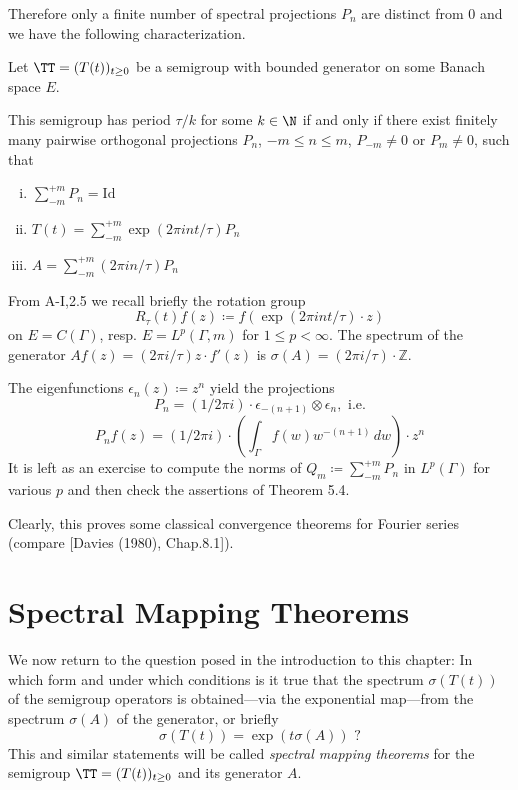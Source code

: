\newpage
Therefore only a finite number of spectral projections $P_{n}$ are distinct from $0$ and we have the following characterization.

\begin{corollary}\label{cor:a3-5.5}

Let $\TT = (T(t))_{t \geq 0}$ be a semigroup with bounded generator on some Banach space $E$.

This semigroup has period $\tau/k$ for some $k \in \N$ if and only if there exist finitely many pairwise orthogonal projections $P_{n}$, $-m \leq n \leq m$, $P_{-m} \neq 0$ or $P_{m} \neq 0$, such that
\begin{enumerate}[(i)]
\item $\sum_{-m}^{+m} P_{n} = \text{Id}$

\item $T(t) = \sum_{-m}^{+m} \exp(2\pi int/\tau)P_{n}$

\item $A = \sum_{-m}^{+m} (2\pi in/\tau)P_{n}$
\end{enumerate}
\end{corollary}

\begin{example}\label{ex:a3-5.6}

From A-I,2.5 we recall briefly the rotation group 
\[
R_{\tau}(t)f(z) \coloneqq f(\exp(2\pi int/\tau) \cdot z)
\]
on $E = C(\Gamma)$, resp. $E = L^{p}(\Gamma,m)$ for $1 \leq p < \infty$.
The spectrum of the generator\quad
$Af(z) = (2\pi i/\tau)z \cdot f'(z)$\quad
is \quad $\sigma(A) = (2\pi i/\tau)\cdot\mathbb{Z}$.

The eigenfunctions $\epsilon_{n}(z) \coloneqq z^{n}$ yield the projections
\[
P_{n} = (1/2\pi i)\cdot\epsilon_{-(n+1)} \otimes \epsilon_{n}, \text{ i.e.}
\]
\[
P_{n}f(z) = (1/2\pi i)\cdot(\int_{\Gamma} f(w)w^{-(n+1)} \, dw)\cdot z^{n}
\]
It is left as an exercise to compute the norms of $Q_{m} \coloneqq \sum_{-m}^{+m} P_{n}$ in $L^{p}(\Gamma)$ for various $p$ and then check the assertions of Theorem 5.4.

Clearly, this proves some classical convergence theorems for Fourier series (compare [Davies (1980), Chap.8.1]).
\end{example}

\section{Spectral Mapping Theorems}\label{sec:a3-6}
We now return to the question posed in the introduction to this chapter: In which form and under which conditions is it true that the spectrum $\sigma(T(t))$ of the semigroup operators is obtained---via the exponential map---from the spectrum $\sigma(A)$ of the generator, or briefly
\[
\sigma(T(t)) = \exp(t\sigma(A)) \text{ ?}
\]
This and similar statements will be called \emph{spectral mapping theorems} for the semigroup $\TT = (T(t))_{t \geq 0}$ and its generator $A$.


